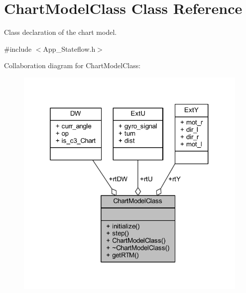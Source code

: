 \hypertarget{class_chart_model_class}{}\section{Chart\+Model\+Class Class Reference}
\label{class_chart_model_class}


Class declaration of the chart model.  




{\ttfamily \#include $<$App\+\_\+\+Stateflow.\+h$>$}



Collaboration diagram for Chart\+Model\+Class\+:
\nopagebreak
\begin{figure}[H]
\begin{center}
\leavevmode
\includegraphics[width=319pt]{class_chart_model_class__coll__graph}
\end{center}
\end{figure}
